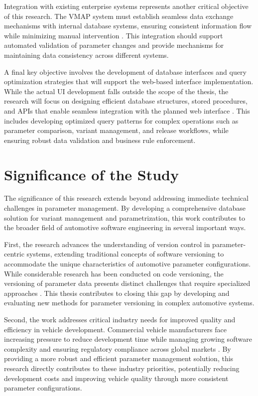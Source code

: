 Integration with existing enterprise systems represents another critical objective of this research. The \ac{VMAP} system must establish seamless data exchange mechanisms with internal database systems, ensuring consistent information flow while minimizing manual intervention \cite{broy2006challenges}. This integration should support automated validation of parameter changes and provide mechanisms for maintaining data consistency across different systems.

A final key objective involves the development of database interfaces and query optimization strategies that will support the web-based interface implementation. While the actual \ac{UI} development falls outside the scope of the thesis, the research will focus on designing efficient database structures, stored procedures, and APIs that enable seamless integration with the planned web interface \cite{pretschner2007software}. This includes developing optimized query patterns for complex operations such as parameter comparison, variant management, and release workflows, while ensuring robust data validation and business rule enforcement.

\section{Significance of the Study}
\label{sec:significance}

The significance of this research extends beyond addressing immediate technical challenges in parameter management. By developing a comprehensive database solution for variant management and parametrization, this work contributes to the broader field of automotive software engineering in several important ways.

First, the research advances the understanding of version control in parameter-centric systems, extending traditional concepts of software versioning to accommodate the unique characteristics of automotive parameter configurations. While considerable research has been conducted on code versioning, the versioning of parameter data presents distinct challenges that require specialized approaches \cite{bhattacherjee2015principles}. This thesis contributes to closing this gap by developing and evaluating new methods for parameter versioning in complex automotive systems.

Second, the work addresses critical industry needs for improved quality and efficiency in vehicle development. Commercial vehicle manufacturers face increasing pressure to reduce development time while managing growing software complexity and ensuring regulatory compliance across global markets \cite{broy2006challenges}. By providing a more robust and efficient parameter management solution, this research directly contributes to these industry priorities, potentially reducing development costs and improving vehicle quality through more consistent parameter configurations.


